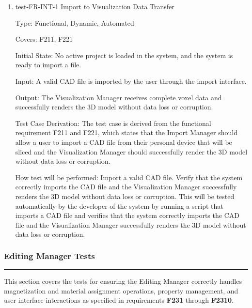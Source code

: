 \documentclass[12pt, titlepage]{article}
\begin{document}
\begin{enumerate}

\item{test-FR-INT-1 Import to Visualization Data Transfer\\}

Type: Functional, Dynamic, Automated

Covers: F211, F221
					
Initial State: No active project is loaded in the system, and the system is ready to import a file.
					
Input: A valid CAD file is imported by the user through the import interface.
					
Output: The Visualization Manager receives complete voxel data and successfully renders the 3D model without data loss or corruption.

Test Case Derivation: The test case is derived from the functional requirement F211 and F221, which states that the Import Manager should allow a user to import a CAD file from their personal device that will be sliced and the Visualization Manager should successfully render the 3D model without data loss or corruption.
					
How test will be performed: Import a valid CAD file. Verify that the system correctly imports the CAD file and the Visualization Manager successfully renders the 3D model without data loss or corruption. This will be tested automatically by the developer of the system by running a script that imports a CAD file and verifies that the system correctly imports the CAD file and the Visualization Manager successfully renders the 3D model without data loss or corruption.


\end{enumerate}

\subsubsection{Editing Manager Tests}
\rule{\textwidth}{0.5pt}

\medskip

\noindent
This section covers the tests for ensuring the Editing Manager correctly
handles magnetization and material assignment operations, property management,
and user interface interactions as specified in requirements \textbf{F231} through \textbf{F2310}.
\end{document}
